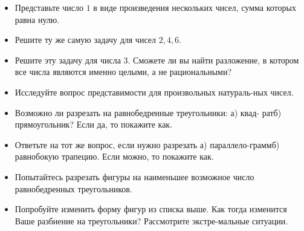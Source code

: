 
\begin{itemize}
\item Представьте число $1$ в виде произведения нескольких чисел, сумма которых равна нулю.
\item Решите ту же самую задачу для чисел $2,4,6$.
\item Решите эту задачу для числа $3$. Сможете ли вы найти разложение, в котором все числа являются именно целыми, а не рациональными?
\item Исследуйте вопрос представимости для произвольных натураль-\linebreak ных чисел.
\end{itemize}


\begin{itemize}
\item Возможно ли разрезать на равнобедренные треугольники: а) квад- рат\scolon б) прямоугольник? Если да, то покажите как.
\item Ответьте на тот же вопрос, если нужно разрезать а) параллело-\linebreak грамм\scolon б) равнобокую трапецию. Если можно, то покажите как.
\item Попытайтесь разрезать фигуры на наименьшее возможное число равнобедренных треугольников.
\item Попробуйте изменить форму фигур из списка выше. Как тогда изменится Ваше разбиение на треугольники? Рассмотрите экстре-\linebreak мальные ситуации.
\end{itemize}